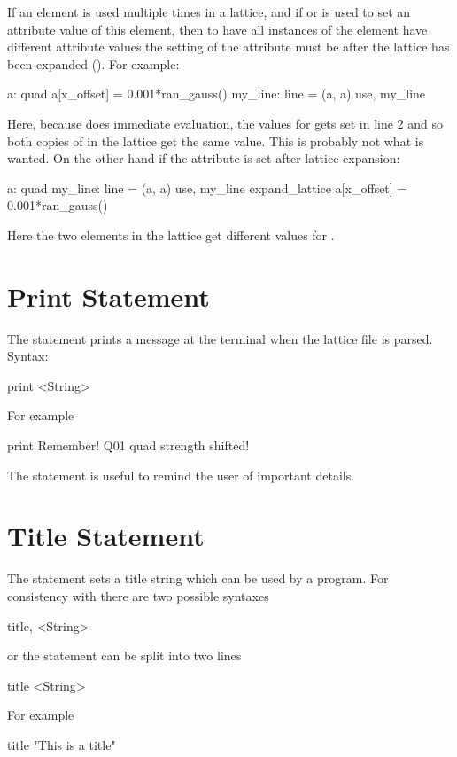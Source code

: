 {
If an element is used multiple times in a lattice, and if  or
 is used to set an attribute value of this element, then
to have all instances of the element have different attribute values
the setting of the attribute must be after the lattice has been
expanded (). For example:
\begin{example}
  a: quad 
  a[x_offset] = 0.001*ran_gauss()
  my_line: line = (a, a)
  use, my_line
\end{example}
Here, because \bmad does immediate evaluation, the 
values for  gets set in line 2 and so both copies of  in
the lattice get the same value. This is probably not what is wanted.
On the other hand if the attribute is set after lattice expansion:
\begin{example}
  a: quad 
  my_line: line = (a, a)
  use, my_line
  expand_lattice
  a[x_offset] = 0.001*ran_gauss()
\end{example}
Here the two  elements in the lattice get different values for
.

\section{Print Statement}
\label{s:print}

The  statement prints a message at the terminal when the 
lattice file is parsed. Syntax:
\begin{example}
  print <String>
\end{example}
For example
\begin{example}
  print Remember! Q01 quad strength shifted!
\end{example}
The  statement is useful to remind the user of important details.

\section{Title Statement}

The  statement sets a title string which can be used by a program. 
For consistency with \mad there are two possible syntaxes
\begin{example}
  title, <String>
\end{example}
or the statement can be split into two lines
\begin{example}
  title
  <String>
\end{example}
For example
\begin{example}
  title
  "This is a title"
\end{example}

}
